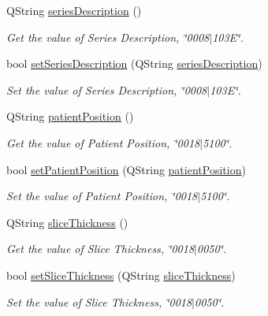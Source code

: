 \begin{DoxyCompactItemize}
Q\+String \hyperlink{class_dicom_dictionary_interface_ab083b929999bd78e8428b94dbbe8346a}{series\+Description} ()
\begin{DoxyCompactList}\small\item\em Get the value of Series Description, \char`\"{}0008$\vert$103\+E\char`\"{}. \end{DoxyCompactList}\item 
bool \hyperlink{class_dicom_dictionary_interface_a680b7c088d0cb60ca55fd19f5967f7e7}{set\+Series\+Description} (Q\+String \hyperlink{class_dicom_dictionary_interface_ab083b929999bd78e8428b94dbbe8346a}{series\+Description})
\begin{DoxyCompactList}\small\item\em Set the value of Series Description, \char`\"{}0008$\vert$103\+E\char`\"{}. \end{DoxyCompactList}\item 
Q\+String \hyperlink{class_dicom_dictionary_interface_a8defce7dd2a8f229371ab0f2a8af39aa}{patient\+Position} ()
\begin{DoxyCompactList}\small\item\em Get the value of Patient Position, \char`\"{}0018$\vert$5100\char`\"{}. \end{DoxyCompactList}\item 
bool \hyperlink{class_dicom_dictionary_interface_af19c49b1768625cfb987032e336a0bfd}{set\+Patient\+Position} (Q\+String \hyperlink{class_dicom_dictionary_interface_a8defce7dd2a8f229371ab0f2a8af39aa}{patient\+Position})
\begin{DoxyCompactList}\small\item\em Set the value of Patient Position, \char`\"{}0018$\vert$5100\char`\"{}. \end{DoxyCompactList}\item 
Q\+String \hyperlink{class_dicom_dictionary_interface_a6e1bd34428c4b354f997a64f9e854e44}{slice\+Thickness} ()
\begin{DoxyCompactList}\small\item\em Get the value of Slice Thickness, \char`\"{}0018$\vert$0050\char`\"{}. \end{DoxyCompactList}\item 
bool \hyperlink{class_dicom_dictionary_interface_a8a12e59b9a2fd11c4113b655dc51ea6c}{set\+Slice\+Thickness} (Q\+String \hyperlink{class_dicom_dictionary_interface_a6e1bd34428c4b354f997a64f9e854e44}{slice\+Thickness})
\begin{DoxyCompactList}\small\item\em Set the value of Slice Thickness, \char`\"{}0018$\vert$0050\char`\"{}. \end{DoxyCompactList}\item 

\end{DoxyCompactItemize}
